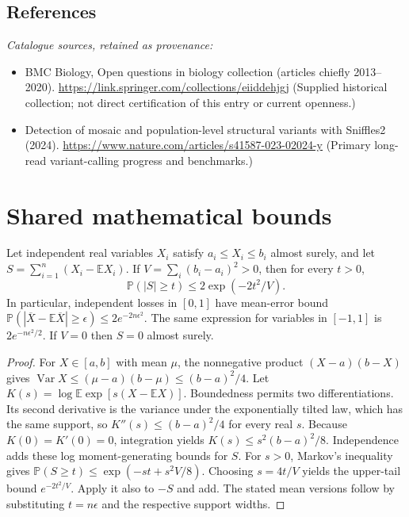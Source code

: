 \documentclass[11pt]{article}
\begin{document}
\subsection{References}
\noindent\emph{Catalogue sources, retained as provenance:}
\begin{itemize}
\item BMC Biology, Open questions in biology collection (articles chiefly 2013--2020). \url{https://link.springer.com/collections/eiiddehjgj} (Supplied historical collection; not direct certification of this entry or current openness.)
\item Detection of mosaic and population-level structural variants with Sniffles2 (2024). \url{https://www.nature.com/articles/s41587-023-02024-y} (Primary long-read variant-calling progress and benchmarks.)
\end{itemize}




\section{Shared mathematical bounds}\label{app:bounds}
\begin{lemma}\label{lem:bounded}
Let independent real variables $X_i$ satisfy $a_i\leq X_i\leq b_i$ almost surely,
and let $S=\sum_{i=1}^n(X_i-\mathbb{E} X_i)$. If
$V=\sum_i(b_i-a_i)^2>0$, then for every $t>0$,
\[
 \mathbb{P}(|S|\geq t)\leq 2\exp(-2t^2/V).
\]
In particular, independent losses in $[0,1]$ have mean-error bound
$\mathbb{P}(|\overline X-\mathbb{E}\overline X|\geq\epsilon)
\leq2e^{-2n\epsilon^2}$. The same expression for variables in $[-1,1]$
is $2e^{-n\epsilon^2/2}$. If $V=0$ then $S=0$ almost surely.
\end{lemma}
\begin{proof}
For $X\in[a,b]$ with mean $\mu$, the nonnegative product
$(X-a)(b-X)$ gives
$\operatorname{Var} X\leq(\mu-a)(b-\mu)\leq(b-a)^2/4$.
Let $K(s)=\log\mathbb{E}\exp[s(X-\mathbb{E} X)]$.
Boundedness permits two differentiations. Its second derivative is the variance
under the exponentially tilted law, which has the same support, so
$K''(s)\leq(b-a)^2/4$ for every real $s$.
Because $K(0)=K'(0)=0$, integration yields
$K(s)\leq s^2(b-a)^2/8$.
Independence adds these log moment-generating bounds for $S$.
For $s>0$, Markov's inequality gives
$\mathbb{P}(S\geq t)\leq\exp(-st+s^2V/8)$.
Choosing $s=4t/V$ yields the upper-tail bound $e^{-2t^2/V}$.
Apply it also to $-S$ and add. The stated mean versions follow by substituting
$t=n\epsilon$ and the respective support widths.
\end{proof}
\end{document}
